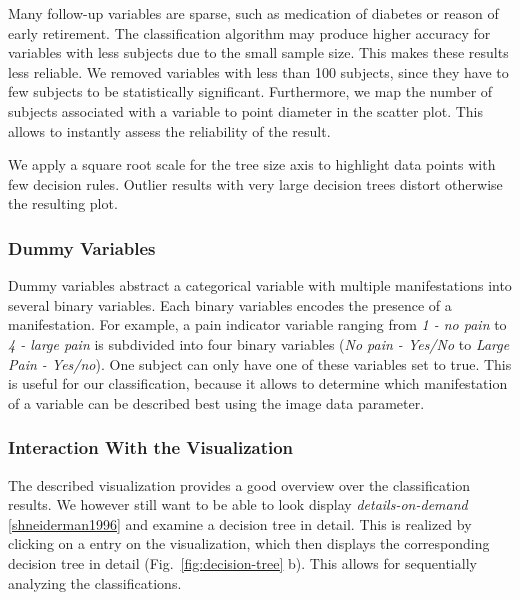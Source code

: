 \documentclass[a4paper,twoside]{style/article}
\newcommand{\com}[1]{\textcolor{orange}{\uline{#1}}}
\begin{document}
Many follow-up variables are sparse, such as medication of diabetes or reason of early retirement.
The classification algorithm may produce higher accuracy for variables with less subjects due to the small sample size.
This makes these results less reliable.
We removed variables with less than 100 subjects, since they have to few subjects to be statistically significant.
Furthermore, we map the number of subjects associated with a variable to point diameter in the scatter plot.
This allows to instantly assess the reliability of the result.

We apply a square root scale for the tree size axis to highlight data points with few decision rules.
Outlier results with very large decision trees distort otherwise the resulting plot.

%
\subsubsection{Dummy Variables}
Dummy variables abstract a categorical variable with multiple manifestations into several binary variables.
Each binary variables encodes the presence of a manifestation.
For example, a pain indicator variable ranging from \emph{1 - no pain} to \emph{4 - large pain} is subdivided into four binary variables (\emph{No pain - Yes/No} to \emph{Large Pain - Yes/no}).
One subject can only have one of these variables set to true.
This is useful for our classification, because it allows to determine which manifestation of a variable can be described best using the image data parameter.
\subsubsection{Interaction With the Visualization}
The described visualization provides a good overview over the classification results.
We however still want to be able to look display \emph{details-on-demand} \ref{shneiderman1996} and examine a decision tree in detail.
This is realized by clicking on a entry on the visualization, which then displays the corresponding decision tree in detail (Fig.~\ref{fig:decision-tree} b).
This allows for sequentially analyzing the classifications.
\end{document}
